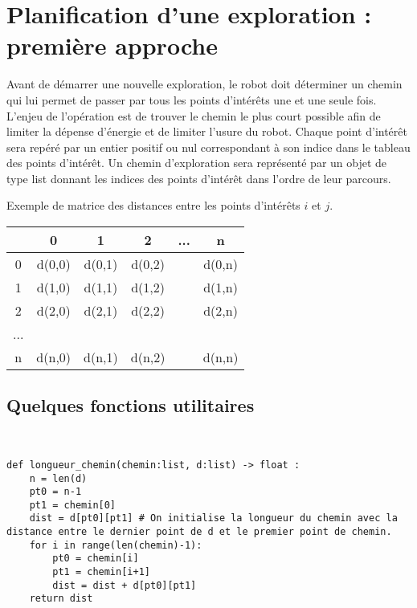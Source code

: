 \section{Planification d’une exploration : première approche}
\ifprof
\else
Avant de démarrer une nouvelle exploration, le robot doit déterminer un chemin qui lui permet de passer par
tous les points d’intérêts une et une seule fois. L’enjeu de l’opération est de trouver le chemin le plus court
possible afin de limiter la dépense d’énergie et de limiter l’usure du robot.
Chaque point d’intérêt sera repéré par un entier positif ou nul correspondant à son indice dans le tableau des
points d’intérêt. Un chemin d’exploration sera représenté par un objet de type list donnant les indices des
points d’intérêt dans l’ordre de leur parcours.

Exemple de matrice des distances entre les points d'intérêts $i$ et $j$.
\begin{center}
\begin{tabular}{|c||c|c|c|c|c|}
\hline
& 0 & 1 & 2 & ... & n \\
\hline \hline 
0 &  d(0,0) & d(0,1) & d(0,2) & & d(0,n)\\ \hline
1 &  d(1,0) & d(1,1) & d(1,2) & & d(1,n)\\ \hline
2 & d(2,0) & d(2,1) & d(2,2) & & d(2,n)\\ \hline
... &  &&&&\\ \hline
n &  d(n,0) & d(n,1) & d(n,2) & & d(n,n)\\ \hline
\end{tabular}
\end{center}
\fi

\subsection{Quelques fonctions utilitaires}

\ifprof
\begin{corrige}~\\ \vspace{-.7cm}
\begin{lstlisting}
def longueur_chemin(chemin:list, d:list) -> float :
    n = len(d)
    pt0 = n-1
    pt1 = chemin[0]
    dist = d[pt0][pt1] # On initialise la longueur du chemin avec la distance entre le dernier point de d et le premier point de chemin.
    for i in range(len(chemin)-1):
        pt0 = chemin[i]
        pt1 = chemin[i+1]
        dist = dist + d[pt0][pt1]
    return dist
\end{lstlisting}
\end{corrige}\else
\fi


